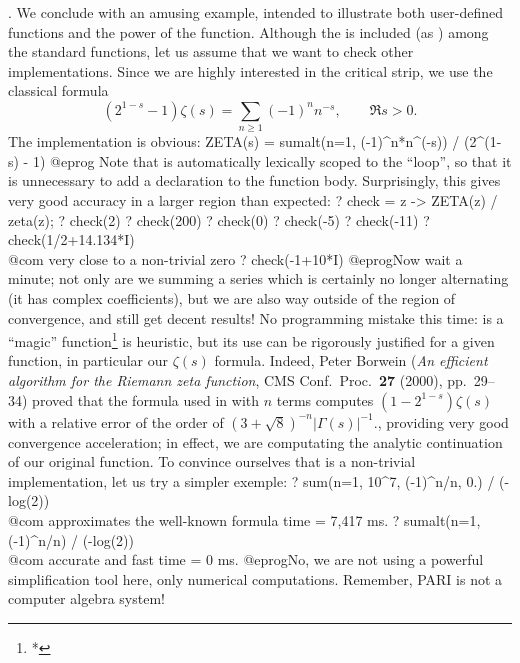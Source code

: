 . We conclude with an amusing example, intended to
illustrate both user-defined functions and the power of the 
function. Although the  is included (as
) among the standard functions, let us assume that we want to check
other implementations. Since we are highly interested in the critical strip,
we use the classical formula
$$ (2^{1-s} - 1)\zeta(s) = \sum_{n\geq 1} (-1)^n n^{-s},
  \qquad\Re s > 0.$$
The implementation is obvious:
\bprog
ZETA(s) = sumalt(n=1, (-1)^n*n^(-s)) / (2^(1-s) - 1)
@eprog
\noindent
Note that  is automatically lexically scoped to the 
``loop'', so that it is unnecessary to add a  declaration to the
function body. Surprisingly, this gives very good accuracy in a larger region
than expected:
\bprog
? check = z -> ZETA(z) / zeta(z);
? check(2)
? check(200)
? check(0)
? check(-5)
? check(-11)
? check(1/2+14.134*I)  \\@com very close to a non-trivial zero
? check(-1+10*I)
@eprog\noindent Now wait a minute; not only are we summing a series which is
certainly no longer alternating (it has complex coefficients), but we are
also way outside of the region of convergence, and still get decent results! No
programming mistake this time:  is a
``magic'' function\footnote{*}{ is heuristic, but its use can be
rigorously justified for a given function, in particular our $\zeta(s)$
formula. Indeed, Peter Borwein (\emph{An efficient algorithm for the Riemann
zeta function}, CMS Conf.~Proc.~{\bf 27} (2000), pp.~29--34) proved that the
formula used in  with $n$ terms computes $(1-2^{1-s})\zeta(s)$
with a relative error of the order of $(3+\sqrt{8})^{-n}|\Gamma(s)|^{-1}$.},
providing very good convergence acceleration; in effect, we are computating
the analytic continuation of our original function. To convince ourselves
that  is a non-trivial implementation, let us try a simpler
exemple:
\bprog
? sum(n=1, 10^7, (-1)^n/n, 0.) / (-log(2)) \\@com approximates the well-known formula
time = 7,417 ms.
? sumalt(n=1, (-1)^n/n) / (-log(2))        \\@com accurate and fast
time = 0 ms.
@eprog\noindent No, we are not using a powerful simplification tool here,
only numerical computations. Remember, PARI is not a computer algebra system!


